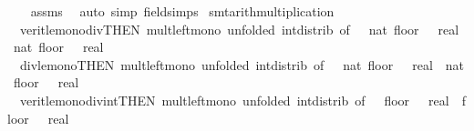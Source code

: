 \begin{isabellebody}
%
\isadelimproof
\ \ %
\endisadelimproof
%
\isatagproof
{}\isamarkupfalse%
\ assms\ \isamarkupfalse%
\ {\isacharparenleft}{\kern0pt}auto\ simp{\isacharcolon}{\kern0pt}\ field{\isacharunderscore}{\kern0pt}simps{\isacharparenright}{\kern0pt}%
\endisatagproof
{\isafoldproof}%
%
\isadelimproof
\isanewline
%
\endisadelimproof
\isanewline
{}\isamarkupfalse%
\ {\isacharbrackleft}{\kern0pt}smt{\isacharunderscore}{\kern0pt}arith{\isacharunderscore}{\kern0pt}multiplication{\isacharbrackright}{\kern0pt}\ {\isacharequal}{\kern0pt}\isanewline
\ \ verit{\isacharunderscore}{\kern0pt}le{\isacharunderscore}{\kern0pt}mono{\isacharunderscore}{\kern0pt}div{\isacharbrackleft}{\kern0pt}THEN\ mult{\isacharunderscore}{\kern0pt}left{\isacharunderscore}{\kern0pt}mono{\isacharcomma}{\kern0pt}\ unfolded\ int{\isacharunderscore}{\kern0pt}distrib{\isacharcomma}{\kern0pt}\ of\ {\isacharunderscore}{\kern0pt}\ {\isacharunderscore}{\kern0pt}\ {\isacartoucheopen}nat\ {\isacharparenleft}{\kern0pt}floor\ {\isacharparenleft}{\kern0pt}{\isacharunderscore}{\kern0pt}\ {\isacharcolon}{\kern0pt}{\isacharcolon}{\kern0pt}\ real{\isacharparenright}{\kern0pt}{\isacharparenright}{\kern0pt}{\isacartoucheclose}\ \ {\isacartoucheopen}nat\ {\isacharparenleft}{\kern0pt}floor\ {\isacharparenleft}{\kern0pt}{\isacharunderscore}{\kern0pt}\ {\isacharcolon}{\kern0pt}{\isacharcolon}{\kern0pt}\ real{\isacharparenright}{\kern0pt}{\isacharparenright}{\kern0pt}{\isacartoucheclose}{\isacharbrackright}{\kern0pt}\isanewline
\ \ div{\isacharunderscore}{\kern0pt}le{\isacharunderscore}{\kern0pt}mono{\isacharbrackleft}{\kern0pt}THEN\ mult{\isacharunderscore}{\kern0pt}left{\isacharunderscore}{\kern0pt}mono{\isacharcomma}{\kern0pt}\ unfolded\ int{\isacharunderscore}{\kern0pt}distrib{\isacharcomma}{\kern0pt}\ of\ {\isacharunderscore}{\kern0pt}\ {\isacharunderscore}{\kern0pt}\ {\isacartoucheopen}nat\ {\isacharparenleft}{\kern0pt}floor\ {\isacharparenleft}{\kern0pt}{\isacharunderscore}{\kern0pt}\ {\isacharcolon}{\kern0pt}{\isacharcolon}{\kern0pt}\ real{\isacharparenright}{\kern0pt}{\isacharparenright}{\kern0pt}{\isacartoucheclose}\ \ {\isacartoucheopen}nat\ {\isacharparenleft}{\kern0pt}floor\ {\isacharparenleft}{\kern0pt}{\isacharunderscore}{\kern0pt}\ {\isacharcolon}{\kern0pt}{\isacharcolon}{\kern0pt}\ real{\isacharparenright}{\kern0pt}{\isacharparenright}{\kern0pt}{\isacartoucheclose}{\isacharbrackright}{\kern0pt}\isanewline
\ \ verit{\isacharunderscore}{\kern0pt}le{\isacharunderscore}{\kern0pt}mono{\isacharunderscore}{\kern0pt}div{\isacharunderscore}{\kern0pt}int{\isacharbrackleft}{\kern0pt}THEN\ mult{\isacharunderscore}{\kern0pt}left{\isacharunderscore}{\kern0pt}mono{\isacharcomma}{\kern0pt}\ unfolded\ int{\isacharunderscore}{\kern0pt}distrib{\isacharcomma}{\kern0pt}\ of\ {\isacharunderscore}{\kern0pt}\ {\isacharunderscore}{\kern0pt}\ {\isacartoucheopen}floor\ {\isacharparenleft}{\kern0pt}{\isacharunderscore}{\kern0pt}\ {\isacharcolon}{\kern0pt}{\isacharcolon}{\kern0pt}\ real{\isacharparenright}{\kern0pt}{\isacartoucheclose}\ \ {\isacartoucheopen}floor\ {\isacharparenleft}{\kern0pt}{\isacharunderscore}{\kern0pt}\ {\isacharcolon}{\kern0pt}{\isacharcolon}{\kern0pt}\ real{\isacharparenright}{\kern0pt}{\isacartoucheclose}{\isacharbrackright}{\kern0pt}\isanewline

\end{isabellebody}

